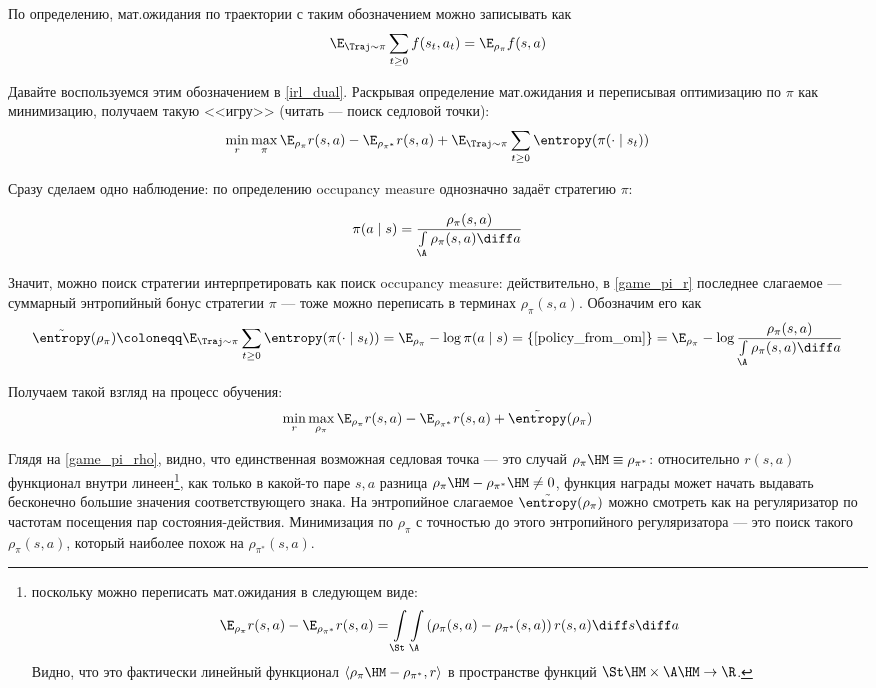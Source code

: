 По определению, мат.ожидания по траектории с таким обозначением можно записывать как
$$\E_{\Traj \sim \pi} \sum_{t \ge 0} f(s_t, a_t) = \E_{\rho_{\pi}} f(s, a)$$

Давайте воспользуемся этим обозначением в \eqref{irl_dual}. Раскрывая определение мат.ожидания и переписывая оптимизацию по $\pi$ как минимизацию, получаем такую <<игру>> (читать --- поиск седловой точки):
\begin{equation}\label{game_pi_r}
\min\limits_{r} \max\limits_{\pi} \E_{\rho_{\pi}} r(s, a) - \E_{\rho_{\pi^*}} r(s, a) + \E_{\Traj \sim \pi} \sum_{t \ge 0} \entropy(\pi(\cdot \mid s_t))
\end{equation}

Сразу сделаем одно наблюдение: по определению occupancy measure однозначно задаёт стратегию $\pi$:

\begin{proposition}
\begin{equation}\label{policy_from_om}
\pi(a \mid s) = \frac{\rho_\pi(s, a)}{\int\limits_{\A} \rho_\pi(s, a) \diff a}
\end{equation}
\end{proposition}

Значит, можно поиск стратегии интерпретировать как поиск occupancy measure: действительно, в \eqref{game_pi_r} последнее слагаемое --- суммарный энтропийный бонус стратегии $\pi$ --- тоже можно переписать в терминах $\rho_\pi(s, a)$. Обозначим его как
$$\tilde{\entropy}(\rho_\pi) \coloneqq \E_{\Traj \sim \pi} \sum_{t \ge 0} \entropy(\pi(\cdot \mid s_t)) = \E_{\rho_\pi} -\log \pi(a \mid s) = \{ \text{\eqref{policy_from_om}} \} = \E_{\rho_\pi} -\log \frac{\rho_\pi(s, a)}{\int\limits_{\A} \rho_\pi(s, a) \diff a}$$

Получаем такой взгляд на процесс обучения:
\begin{equation}\label{game_pi_rho}
\min\limits_{r} \max\limits_{\rho_\pi} \E_{\rho_{\pi}} r(s, a) - \E_{\rho_{\pi^*}} r(s, a) + \tilde{\entropy}(\rho_\pi)
\end{equation}

Глядя на \eqref{game_pi_rho}, видно, что единственная возможная седловая точка --- это случай $\rho_{\pi} \HM\equiv \rho_{\pi^*}$: относительно $r(s, a)$ функционал внутри линеен\footnote{поскольку можно переписать мат.ожидания в следующем виде:
$$\E_{\rho_{\pi}} r(s, a) - \E_{\rho_{\pi^*}} r(s, a) = \int\limits_{\St} \int\limits_{\A} \left(\rho_{\pi}(s, a) - \rho_{\pi^*}(s, a)\right) r(s, a) \diff s \diff a$$
Видно, что это фактически линейный функционал $\langle \rho_{\pi} \HM- \rho_{\pi^*},  r\rangle$ в пространстве функций $\St \HM\times \A \HM\to \R$.}, как только в какой-то паре $s, a$ разница $\rho_{\pi} \HM - \rho_{\pi^*} \HM\neq 0$, функция награды может начать выдавать бесконечно большие значения соответствующего знака. На энтропийное слагаемое $\tilde{\entropy}(\rho_\pi)$ можно смотреть как на регуляризатор по частотам посещения пар состояния-действия. Минимизация по $\rho_\pi$ с точностью до этого энтропийного регуляризатора --- это поиск такого $\rho_\pi(s, a)$, который наиболее похож на $\rho_{\pi^*}(s, a)$.

